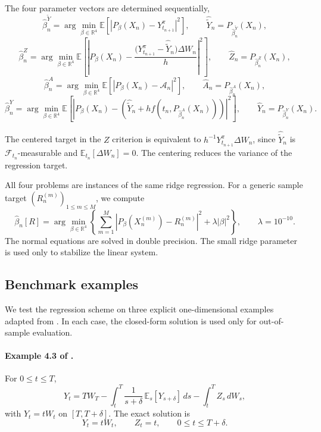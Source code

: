 The four parameter vectors are determined sequentially,
\[
\widehat\beta_n^{\widetilde Y}
=
\arg\min_{\beta\in\mathbb R^4}
\mathbb E\!\left[
\left|P_\beta(X_n)-Y^\pi_{t_{n+1}}\right|^2
\right],
\qquad
\widehat{\widetilde Y}_n=P_{\widehat\beta_n^{\widetilde Y}}(X_n),
\]
\[
\widehat\beta_n^Z
=
\arg\min_{\beta\in\mathbb R^4}
\mathbb E\!\left[
\left|
P_\beta(X_n)
-
\frac{
\bigl(Y^\pi_{t_{n+1}}-\widehat{\widetilde Y}_n\bigr)\Delta W_n}{h}
\right|^2
\right],
\qquad
\widehat Z_n=P_{\widehat\beta_n^Z}(X_n),
\]
\[
\widehat\beta_n^A
=
\arg\min_{\beta\in\mathbb R^4}
\mathbb E\!\left[
\left|P_\beta(X_n)-\mathcal A_n\right|^2
\right],
\qquad
\widehat A_n=P_{\widehat\beta_n^A}(X_n),
\]
\[
\widehat\beta_n^Y
=
\arg\min_{\beta\in\mathbb R^4}
\mathbb E\!\left[
\left|
P_\beta(X_n)
-
\left(
\widehat{\widetilde Y}_n
+h f\!\left(t_n,P_{\widehat\beta_n^A}(X_n)\right)
\right)
\right|^2
\right],
\qquad
\widehat Y_n=P_{\widehat\beta_n^Y}(X_n).
\]

The centered target in the $Z$ criterion is equivalent to
$h^{-1}Y^\pi_{t_{n+1}}\Delta W_n$, since
$\widehat{\widetilde Y}_n$ is $\mathcal F_{t_n}$-measurable and
$\mathbb E_{t_n}[\Delta W_n]=0$. The centering reduces the variance of the
regression target.

All four problems are instances of the same ridge regression. For a
generic sample target $(R_n^{(m)})_{1\leq m\leq M}$, we compute
\[
\widehat\beta_n[R]
=
\arg\min_{\beta\in\mathbb R^4}
\left\{
\sum_{m=1}^M
\left|
P_\beta(X_n^{(m)})-R_n^{(m)}
\right|^2
+\lambda|\beta|^2
\right\},
\qquad \lambda=10^{-10}.
\]
The normal equations are solved in double precision. The small ridge parameter
is used only to stabilize the linear system.

\subsection{Benchmark examples}

We test the regression scheme on three explicit one-dimensional examples adapted
from \citet{peng2009anticipated}. In each case, the closed-form solution is used
only for out-of-sample evaluation.

\paragraph{Example 4.3 of \citet{peng2009anticipated}.}
For $0\leq t\leq T$,
\[
Y_t
=
T W_T
-
\int_t^T \frac{1}{s+\delta}\,
\mathbb E_s[Y_{s+\delta}]\,ds
-
\int_t^T Z_s\,dW_s,
\]
with $Y_t=tW_t$ on $[T,T+\delta]$. The exact solution is
\[
Y_t=tW_t,
\qquad
Z_t=t,
\qquad 0\leq t\leq T+\delta.
\]

